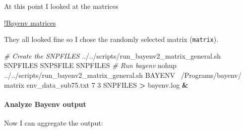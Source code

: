 \documentclass[]{article}
\newenvironment{Shaded}{\begin{snugshade}}{\end{snugshade}}
\newcommand{\KeywordTok}[1]{\textcolor[rgb]{0.13,0.29,0.53}{\textbf{#1}}}
\newcommand{\CommentTok}[1]{\textcolor[rgb]{0.56,0.35,0.01}{\textit{#1}}}
\newcommand{\FunctionTok}[1]{\textcolor[rgb]{0.00,0.00,0.00}{#1}}
\newcommand{\OperatorTok}[1]{\textcolor[rgb]{0.81,0.36,0.00}{\textbf{#1}}}
\newcommand{\ExtensionTok}[1]{#1}
\newcommand{\NormalTok}[1]{#1}
\let\oldparagraph\paragraph
\renewcommand{\paragraph}[1]{\oldparagraph{#1}\mbox{}}
\begin{document}
At this point I looked at the matrices

\href{\%22bayenv/fwsw75_pruned.png\%22}{!Bayenv matrices}

They all looked fine so I chose the randomly selected matrix
(\texttt{matrix}).

\begin{Shaded}
\begin{Highlighting}[]
\CommentTok{# Create the SNPFILES}
\ExtensionTok{../../scripts/run_bayenv2_matrix_general.sh}\NormalTok{ SNPFILES SNPSFILE SNPFILES}
\CommentTok{# Run bayenv}
\FunctionTok{nohup}\NormalTok{ ../../scripts/run_bayenv2_matrix_general.sh BAYENV ~/Programs/bayenv/ matrix env_data_sub75.txt 7 3 SNPFILES }\OperatorTok{>}\NormalTok{ bayenv.log }\KeywordTok{&}
\end{Highlighting}
\end{Shaded}

\paragraph{Analyze Bayenv output}\label{analyze-bayenv-output}

Now I can aggregate the output:
\end{document}
